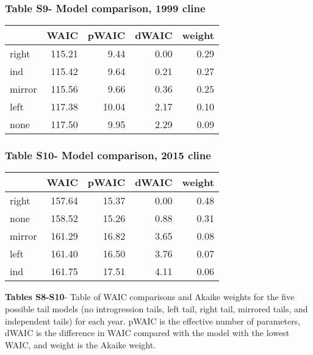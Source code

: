 \documentclass[]{article}
\begin{document}
\subsubsection{Table S9- Model comparison, 1999
cline}\label{table-s9--model-comparison-1999-cline}

\begin{table}[H]
\centering
\begin{tabular}{lrrrr}
\toprule
  & WAIC & pWAIC & dWAIC & weight\\
\midrule
right & 115.21 & 9.44 & 0.00 & 0.29\\
ind & 115.42 & 9.64 & 0.21 & 0.27\\
mirror & 115.56 & 9.66 & 0.36 & 0.25\\
left & 117.38 & 10.04 & 2.17 & 0.10\\
none & 117.50 & 9.95 & 2.29 & 0.09\\
\bottomrule
\end{tabular}
\end{table}

\subsubsection{Table S10- Model comparison, 2015
cline}\label{table-s10--model-comparison-2015-cline}

\begin{table}[H]
\centering
\begin{tabular}{lrrrr}
\toprule
  & WAIC & pWAIC & dWAIC & weight\\
\midrule
right & 157.64 & 15.37 & 0.00 & 0.48\\
none & 158.52 & 15.26 & 0.88 & 0.31\\
mirror & 161.29 & 16.82 & 3.65 & 0.08\\
left & 161.40 & 16.50 & 3.76 & 0.07\\
ind & 161.75 & 17.51 & 4.11 & 0.06\\
\bottomrule
\end{tabular}
\end{table}

\textbf{Tables S8-S10}- Table of WAIC comparisons and Akaike weights for
the five possible tail models (no introgression tails, left tail, right
tail, mirrored tails, and independent tails) for each year. pWAIC is the
effective number of parameters, dWAIC is the difference in WAIC compared
with the model with the lowest WAIC, and weight is the Akaike weight.

\pagebreak
\end{document}

